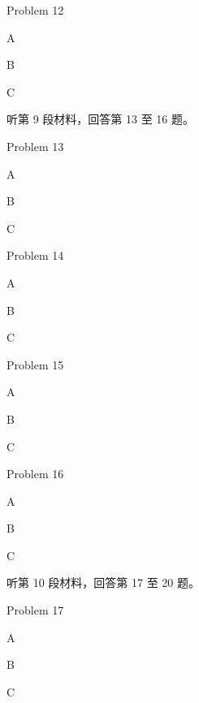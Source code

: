 \documentclass{exam-zh}
\begin{document}
\begin{question}
Problem 12
\begin{choices}
\item A
\item B
\item C
\end{choices}
\end{question}

\begin{flushleft}
听第 9 段材料，回答第 13 至 16 题。
\end{flushleft}

\begin{question}
Problem 13
\begin{choices}
\item A
\item B
\item C
\end{choices}
\end{question}

\begin{question}
Problem 14
\begin{choices}
\item A
\item B
\item C
\end{choices}
\end{question}

\begin{question}
Problem 15
\begin{choices}
\item A
\item B
\item C
\end{choices}
\end{question}

\begin{question}
Problem 16
\begin{choices}
\item A
\item B
\item C
\end{choices}
\end{question}

\begin{flushleft}
听第 10 段材料，回答第 17 至 20 题。
\end{flushleft}

\begin{question}
Problem 17
\begin{choices}
\item A
\item B
\item C
\end{choices}
\end{question}
\end{document}
